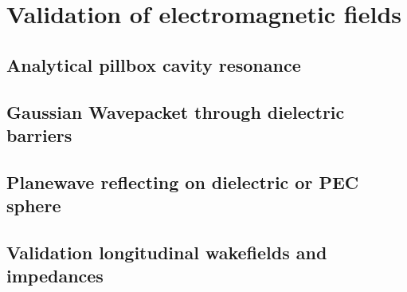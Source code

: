 \section{Validation of electromagnetic fields}

\subsection{Analytical pillbox cavity resonance}



\subsection{Gaussian Wavepacket through dielectric barriers}



\subsection{Planewave reflecting on dielectric or PEC sphere}


\subsection{Validation longitudinal wakefields and impedances}

